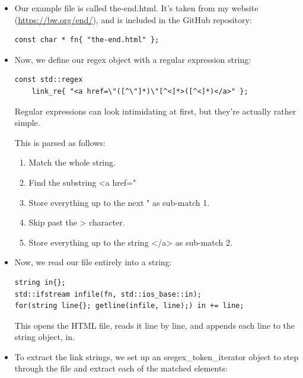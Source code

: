 \begin{itemize}
\item 
Our example file is called the-end.html. It's taken from my website (\url{https://bw.org/end/}), and is included in the GitHub repository:

\begin{lstlisting}[style=styleCXX]
const char * fn{ "the-end.html" };
\end{lstlisting}

\item 
Now, we define our regex object with a regular expression string:

\begin{lstlisting}[style=styleCXX]
const std::regex
	link_re{ "<a href=\"([^\"]*)\"[^<]*>([^<]*)</a>" };
\end{lstlisting}

Regular expressions can look intimidating at first, but they're actually rather simple.

This is parsed as follows:

\begin{enumerate}[label=\Roman*.]
\item 
Match the whole string.

\item 
Find the substring <a href="

\item 
Store everything up to the next " as sub-match 1.

\item 
Skip past the > character.

\item 
Store everything up to the string </a> as sub-match 2.
\end{enumerate}

\item 
Now, we read our file entirely into a string:

\begin{lstlisting}[style=styleCXX]
string in{};
std::ifstream infile(fn, std::ios_base::in);
for(string line{}; getline(infile, line);) in += line;
\end{lstlisting}

This opens the HTML file, reads it line by line, and appends each line to the string object, in.

\item 
To extract the link strings, we set up an sregex\_token\_iterator object to step through the file and extract each of the matched elements:


\end{itemize}
